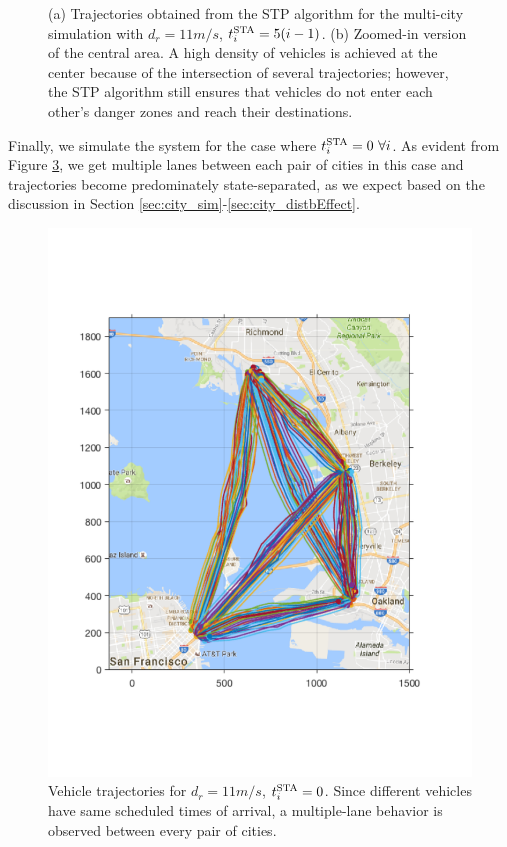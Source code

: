\begin{figure}[H]
\begin{subfigure}{0.5\textwidth}
  \subcaption{}
  \label{fig:bayArea_d11sep5_zoomed}
\end{subfigure}%
  \caption{(a) Trajectories obtained from the STP algorithm for the multi-city simulation with $d_r = 11m/s$, $t^\text{STA}_i = 5(i-1)$. (b) Zoomed-in version of the central area. A high density of vehicles is achieved at the center because of the intersection of several trajectories; however, the STP algorithm still ensures that vehicles do not enter each other's danger zones and reach their destinations.} 
  \label{fig:bayArea_d11sep5_all}
\end{figure}

Finally, we simulate the system for the case where $t^\text{STA}_i = 0 ~\forall i$. As evident from Figure \ref{fig:bayArea_d11sep0}, we get multiple lanes between each pair of cities in this case and trajectories become predominately state-separated, as we expect based on the discussion in Section \ref{sec:city_sim}-\ref{sec:city_distbEffect}.
\begin{figure}[H]
  \centering
  \includegraphics[width=\columnwidth]{figs/bayArea_d11sep0}
  \caption{Vehicle trajectories for $d_r = 11m/s$, $t^\text{STA}_i = 0$. Since different vehicles have same scheduled times of arrival, a multiple-lane behavior is observed between every pair of cities.} 
  \label{fig:bayArea_d11sep0}
\end{figure}

